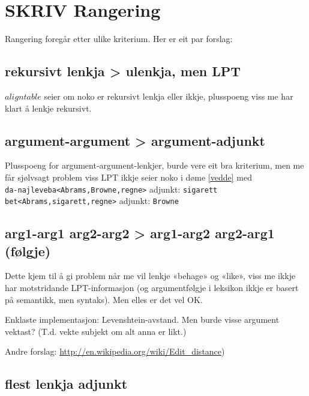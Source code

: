 \documentclass[11pt,a4paper,oneside,draft]{book}
\begin{document}
\section{\textbf{SKRIV} Rangering}
\label{sec-4.2}

\label{SEC:f-rangering}

Rangering foregår etter ulike kriterium. Her er eit par forslag:
\subsection{rekursivt lenkja > ulenkja, men LPT}
\label{sec-4.2.1}

    $aligntable$ seier om noko er rekursivt lenkja eller ikkje,
    plusspoeng viss me har klart å lenkje rekursivt.
\subsection{argument-argument > argument-adjunkt}
\label{sec-4.2.2}

    Plusspoeng for argument-argument-lenkjer, burde vere eit bra
    kriterium, men me får sjølvsagt problem viss LPT ikkje seier noko
    i døme \ref{vedde} med \\
    \texttt{da-najleveba<Abrams,Browne,regne>} adjunkt: \texttt{sigarett}\\
    \texttt{bet<Abrams,sigarett,regne>} adjunkt: \texttt{Browne}
    
\subsection{arg1-arg1 arg2-arg2 > arg1-arg2 arg2-arg1 (følgje)}
\label{sec-4.2.3}

    Dette kjem til å gi problem når me vil lenkje «behage» og «like»,
    viss me ikkje har motstridande LPT-informasjon (og argumentfølgje
    i leksikon ikkje er basert på semantikk, men syntaks). Men elles
    er det vel OK.

    Enklaste implementasjon: Levenshtein-avstand. Men burde visse
    argument vektast? (T.d. vekte subjekt om alt anna er likt.)

    Andre forslag: \href{http://en.wikipedia.org/wiki/Edit_distance}{http://en.wikipedia.org/wiki/Edit\_distance})
\subsection{flest lenkja adjunkt}
\label{sec-4.2.4}
\end{document}
